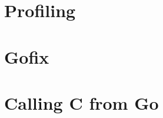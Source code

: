 \section{Profiling}
\label{sec:profiling}



\section{Gofix}
\label{sec:gofix}






\section{Calling C from Go}
\label{sec:cgo}
